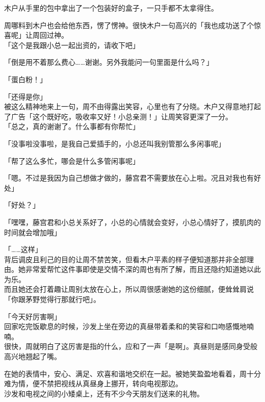 木户从手里的包中拿出了一个包装好的盒子，一只手都不太拿得住。

周哪料到木户也会给他东西，愣了愣神。很快木户一句高兴的「我也成功送了个惊喜呢」让周回过神。\\

「这个是我跟小总一起出资的，请收下吧」

「倒是用不着那么费心……谢谢。另外我能问一句里面是什么吗？」

「蛋白粉！」

「还得是你」\\

被这么精神地来上一句，周不由得露出笑容，心里也有了分晓。木户又得意地打起了广告「这个既好吃，吸收率又好！小总亲测！」让周笑容更深了一分。\\

「总之，真的谢谢了。什么事都有你帮忙」

「没事啦没事啦，是我自己爱插手的，小总还叫我别管那么多闲事呢」

「帮了这么多忙，哪会是什么多管闲事呢」

「嗯。不过是我因为自己想做才做的，藤宫君不需要放在心上啦。况且对我也有好处」

「好处？」

「嘿嘿，藤宫君和小总关系好了，小总的心情就会变好，小总心情好了，摸肌肉的时间就会增加哦」

「……这样」\\

背后调皮且利己的目的让周不禁苦笑，但看木户平素的样子便知道那并非全部理由。她非常爱帮忙这件事即使是交情不深的周也有所了解，而且还隐约知道她以此为乐。\\

而且她还会打着趣让周别太放在心上，所以周很感谢她的这份细腻，便耸耸肩说「你跟茅野觉得行那就行吧」。\\

\vspace{2\baselineskip}

「今天好厉害啊」\\

回家吃完饭歇息的时候，沙发上坐在旁边的真昼带着柔和的笑容和口吻感慨地喃喃。\\

很快，周就明白了这厉害是指的什么，应和了一声「是啊」。真昼则是感同身受般高兴地翘起了嘴。

在她的表情中，安心、满足、欢喜和谐地交织在一起。被她笑盈盈地看着，周十分难为情，便不禁把视线从真昼身上挪开，转向电视那边。\\

沙发和电视之间的小矮桌上，还有不少今天朋友们送来的礼物。\\

